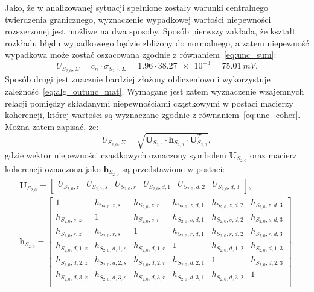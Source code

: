 Jako, że w analizowanej sytuacji spełnione zostały warunki centralnego twierdzenia granicznego, wyznaczenie wypadkowej wartości niepewności rozszerzonej jest możliwe na dwa sposoby. Sposób pierwszy zakłada, że kształt rozkładu błędu wypadkowego będzie zbliżony do normalnego, a zatem niepewność wypadkowa może zostać oszacowana zgodnie z równaniem~\eqref{eq:unc_sum}:
\begin{equation}
U_{S_{2,0},\Sigma} = c_{n} \cdot \sigma_{S_{2,0},\Sigma} = 1.96 \cdot \num{38.27e-3} = \qty{75.01}{mV} \label{eq:sym_partd_output_unc_total_a_S_2_0}.
\end{equation}
Sposób drugi jest znacznie bardziej złożony obliczeniowo i wykorzystuje zależność~\eqref{eq:alg_outunc_mat}. Wymagane jest zatem wyznaczenie wzajemnych relacji pomiędzy składanymi niepewnościami cząstkowymi w postaci macierzy koherencji, której wartości są wyznaczane zgodnie z równaniem~\eqref{eq:unc_coher}. Można zatem zapisać, że:
\begin{equation}
U_{S_{2,0},\Sigma} = \sqrt{\mathbf{U}_{S_{2,0}} \cdot \mathbf{h}_{S_{2,0}} \cdot \mathbf{U}_{S_{2,0}}^{T}} \label{eq:sym_partd_output_unc_summul_S_2_0},
\end{equation}
gdzie wektor niepewności cząstkowych oznaczony symbolem $\mathbf{U}_{S_{2,0}}$ oraz macierz koherencji oznaczona jako $\mathbf{h}_{S_{2,0}}$ są przedstawione w postaci:
\begin{gather}
\mathbf{U}_{S_{2,0}} =
\begin{bmatrix}
U_{S_{2,0},z} & U_{S_{2,0},s} & U_{S_{2,0},r} & U_{S_{2,0},d,1} & U_{S_{2,0},d,2} & U_{S_{2,0},d,3}
\end{bmatrix}
\label{eq:sym_partd_output_unc_sumuvect_S_2_0}, \\
\mathbf{h}_{S_{2,0}} =
\begin{bmatrix}
1                 & h_{S_{2,0},z,s}   & h_{S_{2,0},z,r}   & h_{S_{2,0},z,d,1} & h_{S_{2,0},z,d,2} & h_{S_{2,0},z,d,3} \\
h_{S_{2,0},s,z}   & 1                 & h_{S_{2,0},s,r}   & h_{S_{2,0},s,d,1} & h_{S_{2,0},s,d,2} & h_{S_{2,0},s,d,3} \\
h_{S_{2,0},r,z}   & h_{S_{2,0},r,s}   & 1                 & h_{S_{2,0},r,d,1} & h_{S_{2,0},r,d,2} & h_{S_{2,0},r,d,3} \\
h_{S_{2,0},d,1,z} & h_{S_{2,0},d,1,s} & h_{S_{2,0},d,1,r} & 1                 & h_{S_{2,0},d,1,2} & h_{S_{2,0},d,1,3} \\
h_{S_{2,0},d,2,z} & h_{S_{2,0},d,2,s} & h_{S_{2,0},d,2,r} & h_{S_{2,0},d,2,1} & 1                 & h_{S_{2,0},d,2,3} \\
h_{S_{2,0},d,3,z} & h_{S_{2,0},d,3,s} & h_{S_{2,0},d,3,r} & h_{S_{2,0},d,3,1} & h_{S_{2,0},d,3,2} & 1                 \\
\end{bmatrix}
\label{eq:sym_partd_output_unc_sumcoher_S_2_0}.
\end{gather}
